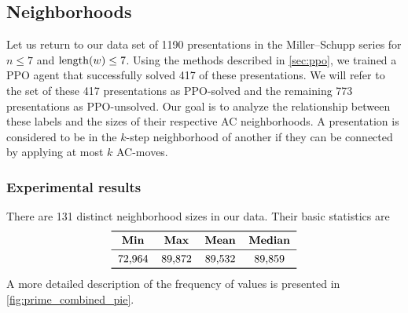
\subsection{Neighborhoods}

Let us return to our data set of 1190 presentations in the Miller–Schupp series for \(n \leq 7\) and \(\operatorname{length}(w) \leq 7\).
Using the methods described in \autoref{sec:ppo}, we trained a PPO agent that successfully solved 417 of these presentations. We will refer to the set of these 417 presentations as PPO-solved and the remaining 773 presentations as PPO-unsolved.
Our goal is to analyze the relationship between these labels and the sizes of their respective AC neighborhoods.
A presentation is considered to be in the \(k\)-step neighborhood of another if they can be connected by applying at most \(k\) AC-moves.

\subsubsection{Experimental results}

There are 131 distinct neighborhood sizes in our data.
Their basic statistics are
\[
\begin{tabular}{cccccc}
	\toprule
	\textbf{Min} & \textbf{Max} & \textbf{Mean} & \textbf{Median} \\
	\midrule
	72,964 & 89,872 & 89,532 & 89,859 \\
	\bottomrule
\end{tabular}
\]
A more detailed description of the frequency of values is presented in \autoref{fig:prime_combined_pie}.


